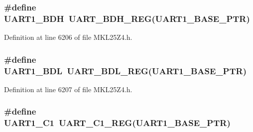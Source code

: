 \subsubsection[{\texorpdfstring{U\+A\+R\+T1\+\_\+\+B\+DH}{UART1_BDH}}]{\setlength{\rightskip}{0pt plus 5cm}\#define U\+A\+R\+T1\+\_\+\+B\+DH~{\bf U\+A\+R\+T\+\_\+\+B\+D\+H\+\_\+\+R\+EG}({\bf U\+A\+R\+T1\+\_\+\+B\+A\+S\+E\+\_\+\+P\+TR})}\hypertarget{group___u_a_r_t___register___accessor___macros_gaf95dfcbfc36021f99e8798340dcc61aa}{}\label{group___u_a_r_t___register___accessor___macros_gaf95dfcbfc36021f99e8798340dcc61aa}


Definition at line 6206 of file M\+K\+L25\+Z4.\+h.

\subsubsection[{\texorpdfstring{U\+A\+R\+T1\+\_\+\+B\+DL}{UART1_BDL}}]{\setlength{\rightskip}{0pt plus 5cm}\#define U\+A\+R\+T1\+\_\+\+B\+DL~{\bf U\+A\+R\+T\+\_\+\+B\+D\+L\+\_\+\+R\+EG}({\bf U\+A\+R\+T1\+\_\+\+B\+A\+S\+E\+\_\+\+P\+TR})}\hypertarget{group___u_a_r_t___register___accessor___macros_gae8924d1fd89b33ae7d25b0727dab5c47}{}\label{group___u_a_r_t___register___accessor___macros_gae8924d1fd89b33ae7d25b0727dab5c47}


Definition at line 6207 of file M\+K\+L25\+Z4.\+h.

\subsubsection[{\texorpdfstring{U\+A\+R\+T1\+\_\+\+C1}{UART1_C1}}]{\setlength{\rightskip}{0pt plus 5cm}\#define U\+A\+R\+T1\+\_\+\+C1~{\bf U\+A\+R\+T\+\_\+\+C1\+\_\+\+R\+EG}({\bf U\+A\+R\+T1\+\_\+\+B\+A\+S\+E\+\_\+\+P\+TR})}\hypertarget{group___u_a_r_t___register___accessor___macros_gaabfc6382968ea7dd6bb14f7098f28fd9}{}\label{group___u_a_r_t___register___accessor___macros_gaabfc6382968ea7dd6bb14f7098f28fd9}


